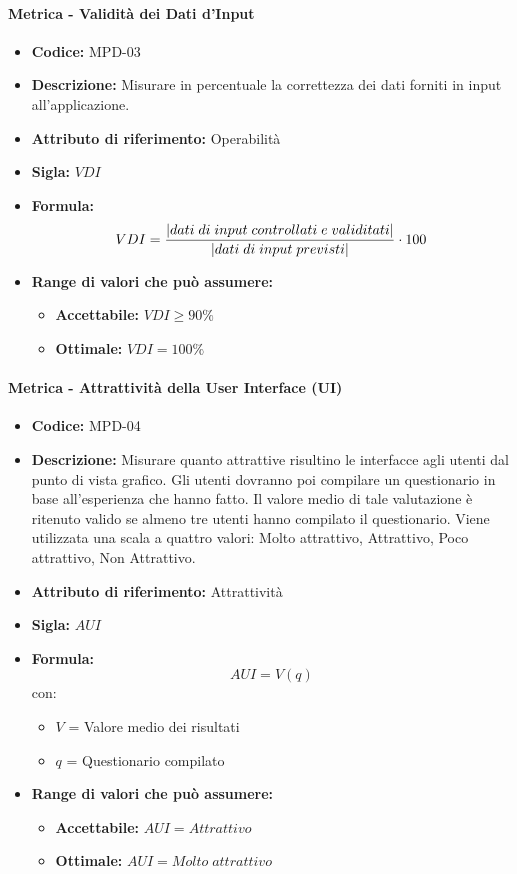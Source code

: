 \paragraph{Metrica - Validità dei Dati d'Input} 
\begin{itemize}
    \item \textbf{Codice:} MPD-03
    \item \textbf{Descrizione:} Misurare in percentuale la correttezza dei dati forniti in input all'applicazione.
    \item \textbf{Attributo di riferimento:} Operabilità
    \item \textbf{Sigla:} $VDI$
    \item \textbf{Formula:} $$VDI = {|dati \; di \; input \; controllati \; e \; validitati| \over |dati \; di \; input \; previsti|} \cdot 100$$  
    \item \textbf{Range di valori che può assumere:}
    \begin{itemize}
        \item \textbf{Accettabile:} $VDI \geq 90\%$
        \item \textbf{Ottimale:} $VDI = 100\%$
    \end{itemize}
\end{itemize}

\paragraph{Metrica - Attrattività della User Interface (UI)} 
\begin{itemize}
    \item \textbf{Codice: } MPD-04
    \item \textbf{Descrizione:} Misurare quanto attrattive risultino le interfacce agli utenti dal punto di vista grafico.
    Gli utenti dovranno poi compilare un questionario in base all'esperienza che hanno fatto.
    Il valore medio di tale valutazione è ritenuto valido se almeno tre utenti hanno compilato il questionario. 
    Viene utilizzata una scala a quattro valori: Molto attrattivo, Attrattivo, Poco attrattivo, Non Attrattivo.
    \item \textbf{Attributo di riferimento:} Attrattività
    \item \textbf{Sigla:} $AUI$
    \item \textbf{Formula:}$$AUI = V(q) $$
    con:
        \begin{itemize}
        \item $V$ = Valore medio dei risultati
        \item $q$ = Questionario compilato
        \end{itemize}
    \item \textbf{Range di valori che può assumere:}
        \begin{itemize}
            \item \textbf{Accettabile:} $AUI = Attrattivo$ 
            \item \textbf{Ottimale:} $AUI = Molto \; attrattivo$
        \end{itemize}
\end{itemize}

